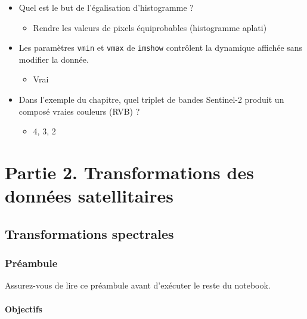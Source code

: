 \documentclass[
  french,
  11pt,
  letterpaper,
  open=any,
  twoside=false,
  french]{scrbook}
\providecommand{\tightlist}{%
  \setlength{\itemsep}{0pt}\setlength{\parskip}{0pt}}
\begin{document}
\begin{itemize}
  \begin{itemize}
  \tightlist
  \item
    Le passage en décibels (10·log10)
  \end{itemize}
\item
  Quel est le but de l'égalisation d'histogramme ?

  \begin{itemize}
  \tightlist
  \item
    Rendre les valeurs de pixels équiprobables (histogramme aplati)
  \end{itemize}
\item
  Les paramètres \texttt{vmin} et \texttt{vmax} de \texttt{imshow}
  contrôlent la dynamique affichée sans modifier la donnée.

  \begin{itemize}
  \tightlist
  \item
    Vrai
  \end{itemize}
\item
  Dans l'exemple du chapitre, quel triplet de bandes Sentinel-2 produit
  un composé vraies couleurs (RVB) ?

  \begin{itemize}
  \tightlist
  \item
    4, 3, 2
  \end{itemize}
\end{itemize}

\part{Partie 2. Transformations des données satellitaires}


\chapter{Transformations spectrales}\label{sec-chap03}

\section{Préambule}\label{pruxe9ambule-2}

Assurez-vous de lire ce préambule avant d'exécuter le reste du notebook.

\subsection{Objectifs}\label{objectifs-2}
\end{document}
